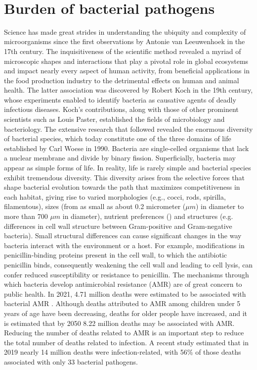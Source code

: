 \renewcommand*{\thefootnote}{\arabic{footnote}}

\mbox{}\\
\vspace{8cm}

\section{Burden of bacterial pathogens}

Science has made great strides in understanding the ubiquity and complexity of microorganisms since the first observations by Antonie van Leeuwenhoek in the 17th century. The inquisitiveness of the scientific method revealed a myriad of microscopic shapes and interactions that play a pivotal role in global ecosystems and impact nearly every aspect of human activity, from beneficial applications in the food production industry to the detrimental effects on human and animal health. The latter association was discovered by Robert Koch in the 19th century, whose experiments enabled to identify bacteria as causative agents of deadly infectious diseases. Koch’s contributions, along with those of other prominent scientists such as Louis Paster, established the fields of microbiology and bacteriology. The extensive research that followed revealed the enormous diversity of bacterial species, which today constitute one of the three domains of life established by Carl Woese in 1990.
Bacteria are single-celled organisms that lack a nuclear membrane and divide by binary fission. Superficially, bacteria may appear as simple forms of life. In reality, life is rarely simple and bacterial species exhibit tremendous diversity. This diversity arises from the selective forces that shape bacterial evolution towards the path that maximizes competitiveness in each habitat, giving rise to varied morphologies (e.g., cocci, rods, spirilla, filamentous), sizes (from as small as about 0.2 micrometer ($\mu m$) in diameter to more than 700 $\mu m$ in diameter), nutrient preferences () and structures (e.g. differences in cell wall structure between Gram-positive and Gram-negative bacteria).
Small structural differences can cause significant changes in the way bacteria interact with the environment or a host. For example, modifications in penicillin-binding proteins present in the cell wall, to which the antibiotic penicillin binds, consequently weakening the cell wall and leading to cell lysis, can confer reduced susceptibility or resistance to penicillin. The mechanisms through which bacteria develop antimicrobial resistance (AMR) are of great concern to public health. In 2021, 4.71 million deaths were estimated to be associated with bacterial \ac{AMR} \cite{naghavi_global_2024}. Although deaths attributed to \ac{AMR} among children under 5 years of age have been decreasing, deaths for older people have increased, and it is estimated that by 2050 8.22 million deaths may be associated with \ac{AMR}. Reducing the number of deaths related to \ac{AMR} is an important step to reduce the total number of deaths related to infection. A recent study estimated that in 2019 nearly 14 million deaths were infection-related, with 56\% of those deaths associated with only 33 bacterial pathogens.

